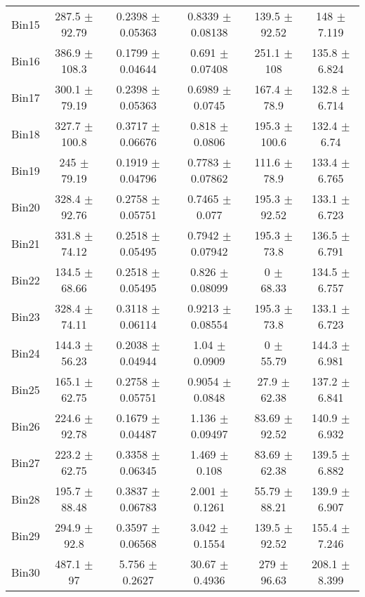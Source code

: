 \begin{tabular}{@{\extracolsep{4pt}}lccccc@{}}
     Bin15 & 287.5 $\pm$ 92.79 & 0.2398 $\pm$ 0.05363 & 0.8339 $\pm$ 0.08138 & 139.5 $\pm$ 92.52 & 148 $\pm$ 7.119 \\ 
     Bin16 & 386.9 $\pm$ 108.3 & 0.1799 $\pm$ 0.04644 & 0.691 $\pm$ 0.07408 & 251.1 $\pm$ 108 & 135.8 $\pm$ 6.824 \\ 
     Bin17 & 300.1 $\pm$ 79.19 & 0.2398 $\pm$ 0.05363 & 0.6989 $\pm$ 0.0745 & 167.4 $\pm$ 78.9 & 132.8 $\pm$ 6.714 \\ 
     Bin18 & 327.7 $\pm$ 100.8 & 0.3717 $\pm$ 0.06676 & 0.818 $\pm$ 0.0806 & 195.3 $\pm$ 100.6 & 132.4 $\pm$ 6.74 \\ 
     Bin19 & 245 $\pm$ 79.19 & 0.1919 $\pm$ 0.04796 & 0.7783 $\pm$ 0.07862 & 111.6 $\pm$ 78.9 & 133.4 $\pm$ 6.765 \\ 
     Bin20 & 328.4 $\pm$ 92.76 & 0.2758 $\pm$ 0.05751 & 0.7465 $\pm$ 0.077 & 195.3 $\pm$ 92.52 & 133.1 $\pm$ 6.723 \\ 
     Bin21 & 331.8 $\pm$ 74.12 & 0.2518 $\pm$ 0.05495 & 0.7942 $\pm$ 0.07942 & 195.3 $\pm$ 73.8 & 136.5 $\pm$ 6.791 \\ 
     Bin22 & 134.5 $\pm$ 68.66 & 0.2518 $\pm$ 0.05495 & 0.826 $\pm$ 0.08099 & 0 $\pm$ 68.33 & 134.5 $\pm$ 6.757 \\ 
     Bin23 & 328.4 $\pm$ 74.11 & 0.3118 $\pm$ 0.06114 & 0.9213 $\pm$ 0.08554 & 195.3 $\pm$ 73.8 & 133.1 $\pm$ 6.723 \\ 
     Bin24 & 144.3 $\pm$ 56.23 & 0.2038 $\pm$ 0.04944 & 1.04 $\pm$ 0.0909 & 0 $\pm$ 55.79 & 144.3 $\pm$ 6.981 \\ 
     Bin25 & 165.1 $\pm$ 62.75 & 0.2758 $\pm$ 0.05751 & 0.9054 $\pm$ 0.0848 & 27.9 $\pm$ 62.38 & 137.2 $\pm$ 6.841 \\ 
     Bin26 & 224.6 $\pm$ 92.78 & 0.1679 $\pm$ 0.04487 & 1.136 $\pm$ 0.09497 & 83.69 $\pm$ 92.52 & 140.9 $\pm$ 6.932 \\ 
     Bin27 & 223.2 $\pm$ 62.75 & 0.3358 $\pm$ 0.06345 & 1.469 $\pm$ 0.108 & 83.69 $\pm$ 62.38 & 139.5 $\pm$ 6.882 \\ 
     Bin28 & 195.7 $\pm$ 88.48 & 0.3837 $\pm$ 0.06783 & 2.001 $\pm$ 0.1261 & 55.79 $\pm$ 88.21 & 139.9 $\pm$ 6.907 \\ 
     Bin29 & 294.9 $\pm$ 92.8 & 0.3597 $\pm$ 0.06568 & 3.042 $\pm$ 0.1554 & 139.5 $\pm$ 92.52 & 155.4 $\pm$ 7.246 \\ 
     Bin30 & 487.1 $\pm$ 97 & 5.756 $\pm$ 0.2627 & 30.67 $\pm$ 0.4936 & 279 $\pm$ 96.63 & 208.1 $\pm$ 8.399 \\ 
\hline\hline
  \end{tabular}
